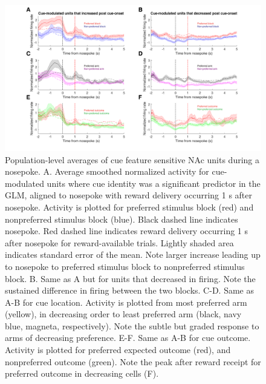 \documentclass[11pt]{article}
\begin{document}
\begin{figure}[h]
\centering
\includegraphics[width=\textwidth]{Fig 11 - NP population averages.png}
\caption{Population-level averages of cue feature sensitive NAc units during a nosepoke. A. Average smoothed normalized activity for cue-modulated units where cue identity was a significant predictor in the GLM, aligned to nosepoke with reward delivery occurring 1 s after nosepoke. Activity is plotted for preferred stimulus block (red) and nonpreferred stimulus block (blue). Black dashed line indicates nosepoke. Red dashed line indicates reward delivery occurring 1 s after nosepoke for reward-available trials. Lightly shaded area indicates standard error of the mean. Note larger increase leading up to nosepoke to preferred stimulus block to nonpreferred stimulus block. B. Same as A but for units that decreased in firing. Note the sustained difference in firing between the two blocks. C-D. Same as A-B for cue location. Activity is plotted from most preferred arm (yellow), in decreasing order to least preferred arm (black, navy blue, magneta, respectively). Note the subtle but graded response to arms of decreasing preference. E-F. Same as A-B for cue outcome. Activity is plotted for preferred expected outcome (red), and nonpreferred outcome (green). Note the peak after reward receipt for preferred outcome in decreasing cells (F).}
\label{fig:NP_pop}
\end{figure}
\end{document}
